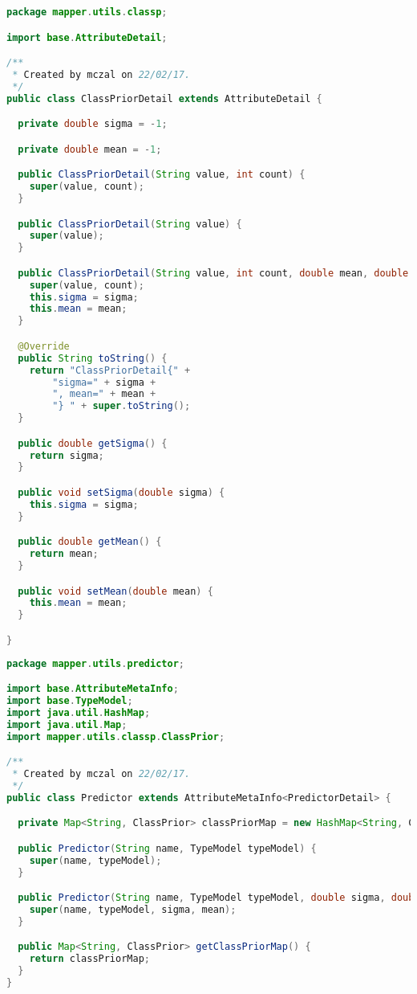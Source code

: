 \begin{lstlisting}[language=Java,basicstyle=\tiny,caption=ClassPriorDetail.java]
package mapper.utils.classp;

import base.AttributeDetail;

/**
 * Created by mczal on 22/02/17.
 */
public class ClassPriorDetail extends AttributeDetail {

  private double sigma = -1;

  private double mean = -1;

  public ClassPriorDetail(String value, int count) {
    super(value, count);
  }

  public ClassPriorDetail(String value) {
    super(value);
  }

  public ClassPriorDetail(String value, int count, double mean, double sigma) {
    super(value, count);
    this.sigma = sigma;
    this.mean = mean;
  }

  @Override
  public String toString() {
    return "ClassPriorDetail{" +
        "sigma=" + sigma +
        ", mean=" + mean +
        "} " + super.toString();
  }

  public double getSigma() {
    return sigma;
  }

  public void setSigma(double sigma) {
    this.sigma = sigma;
  }

  public double getMean() {
    return mean;
  }

  public void setMean(double mean) {
    this.mean = mean;
  }

}
\end{lstlisting}


\begin{lstlisting}[language=Java,basicstyle=\tiny,caption=Predictor.java]
package mapper.utils.predictor;

import base.AttributeMetaInfo;
import base.TypeModel;
import java.util.HashMap;
import java.util.Map;
import mapper.utils.classp.ClassPrior;

/**
 * Created by mczal on 22/02/17.
 */
public class Predictor extends AttributeMetaInfo<PredictorDetail> {

  private Map<String, ClassPrior> classPriorMap = new HashMap<String, ClassPrior>();

  public Predictor(String name, TypeModel typeModel) {
    super(name, typeModel);
  }

  public Predictor(String name, TypeModel typeModel, double sigma, double mean) {
    super(name, typeModel, sigma, mean);
  }

  public Map<String, ClassPrior> getClassPriorMap() {
    return classPriorMap;
  }
}
\end{lstlisting}


